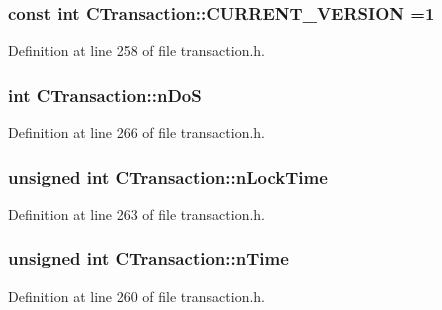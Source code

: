 \subsubsection[{C\+U\+R\+R\+E\+N\+T\+\_\+\+V\+E\+R\+S\+I\+O\+N}]{\setlength{\rightskip}{0pt plus 5cm}const int C\+Transaction\+::\+C\+U\+R\+R\+E\+N\+T\+\_\+\+V\+E\+R\+S\+I\+O\+N =1\hspace{0.3cm}{\ttfamily [static]}}\label{class_c_transaction_aa728c112d5cdd174ee156a67107f1cf4}


Definition at line 258 of file transaction.\+h.

\hypertarget{class_c_transaction_a2a1fd6929add85d3df299249da78d015}{}
\subsubsection[{n\+Do\+S}]{\setlength{\rightskip}{0pt plus 5cm}int C\+Transaction\+::n\+Do\+S\hspace{0.3cm}{\ttfamily [mutable]}}\label{class_c_transaction_a2a1fd6929add85d3df299249da78d015}


Definition at line 266 of file transaction.\+h.

\hypertarget{class_c_transaction_ab01e4e451d2f3f84b01380979c8fdacc}{}
\subsubsection[{n\+Lock\+Time}]{\setlength{\rightskip}{0pt plus 5cm}unsigned int C\+Transaction\+::n\+Lock\+Time}\label{class_c_transaction_ab01e4e451d2f3f84b01380979c8fdacc}


Definition at line 263 of file transaction.\+h.

\hypertarget{class_c_transaction_a8ccb4b6020669bc562095e3417715e41}{}
\subsubsection[{n\+Time}]{\setlength{\rightskip}{0pt plus 5cm}unsigned int C\+Transaction\+::n\+Time}\label{class_c_transaction_a8ccb4b6020669bc562095e3417715e41}


Definition at line 260 of file transaction.\+h.

